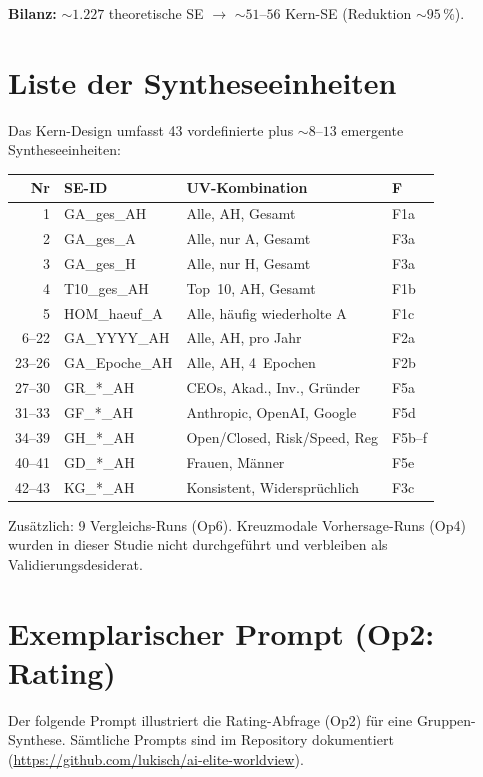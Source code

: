 \documentclass[12pt,a4paper]{article}
\begin{document}
\textbf{Bilanz:} ${\sim}1.227$ theoretische SE $\to$ ${\sim}51$--$56$ Kern-SE (Reduktion ${\sim}95$\,\%).


\section{Liste der Syntheseeinheiten}
\label{app:se}

Das Kern-Design umfasst 43 vordefinierte plus ${\sim}8$--$13$ emergente Syntheseeinheiten:

{\small
\begin{longtable}{r l l l}
  \toprule
  \textbf{Nr} & \textbf{SE-ID} & \textbf{UV-Kombination} & \textbf{F} \\
  \midrule
  \endfirsthead
  1 & GA\_ges\_AH & Alle, AH, Gesamt & F1a \\
  2 & GA\_ges\_A & Alle, nur A, Gesamt & F3a \\
  3 & GA\_ges\_H & Alle, nur H, Gesamt & F3a \\
  4 & T10\_ges\_AH & Top~10, AH, Gesamt & F1b \\
  5 & HOM\_haeuf\_A & Alle, h\"aufig wiederholte A & F1c \\
  6--22 & GA\_YYYY\_AH & Alle, AH, pro Jahr & F2a \\
  23--26 & GA\_Epoche\_AH & Alle, AH, 4~Epochen & F2b \\
  27--30 & GR\_*\_AH & CEOs, Akad., Inv., Gr\"under & F5a \\
  31--33 & GF\_*\_AH & Anthropic, OpenAI, Google & F5d \\
  34--39 & GH\_*\_AH & Open/Closed, Risk/Speed, Reg & F5b--f \\
  40--41 & GD\_*\_AH & Frauen, M\"anner & F5e \\
  42--43 & KG\_*\_AH & Konsistent, Widerspr\"uchlich & F3c \\
  \bottomrule
\end{longtable}
}

Zus\"atzlich: 9 Vergleichs-Runs (Op6). Kreuzmodale Vorhersage-Runs (Op4) wurden in dieser Studie nicht durchgef\"uhrt und verbleiben als Validierungsdesiderat.


\section{Exemplarischer Prompt (Op2: Rating)}
\label{app:prompt}

Der folgende Prompt illustriert die Rating-Abfrage (Op2) f\"ur eine Gruppen-Synthese. S\"amtliche Prompts sind im Repository dokumentiert (\url{https://github.com/lukisch/ai-elite-worldview}).
\end{document}
